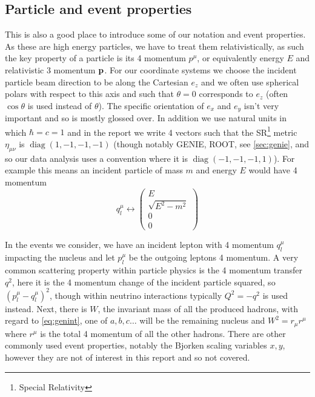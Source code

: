 \documentclass[a4paper,12pt]{article}
\DeclareMathOperator{\diag}{diag}
\begin{document}
\subsection{Particle and event properties}
This is also a good place to introduce some of our notation and event properties.
As these are high energy particles, we have to treat them relativistically, as such the key property of a particle is its 4 momentum $p^\mu$, or equivalently energy $E$ and relativistic 3 momentum $\vb{p}$.
For our coordinate systems we choose the incident particle beam direction to be along the Cartesian $e_z$ and we often use spherical polars with respect to this axis and such that $\theta = 0$ corresponds to $e_z$ (often $\cos{\theta}$ is used instead of $\theta$).
The specific orientation of $e_x$ and $e_y$ isn't very important and so is mostly glossed over.
In addition we use natural units in which $\hbar = c = 1$ and in the report we write 4 vectors such that the SR\footnote{Special Relativity} metric $\eta_{\mu \nu}$ is $\diag(1, -1, -1, -1)$ (though notably GENIE, ROOT, see \cref{sec:genie}, and so our data analysis uses a convention where it is $\diag(-1, -1, -1, 1)$).
For example this means an incident particle of mass $m$ and energy $E$ would have 4 momentum
\begin{equation}
    q_l^\mu \leftrightarrow \begin{pmatrix} E \\ \sqrt{E^2 - m^2} \\ 0 \\ 0 \end{pmatrix}
\end{equation}

In the events we consider, we have an incident lepton with 4 momentum $q_{l}^\mu$ impacting the nucleus and let $p_l^\mu$ be the outgoing leptons 4 momentum.
A very common scattering property within particle physics is the 4 momentum transfer $q^2$, here it is the 4 momentum change of the incident particle squared, so $(p_l^\mu - q_l^\mu)^2$, though within neutrino interactions typically $Q^2 = -q^2$ is used instead.
Next, there is $W$, the invariant mass of all the produced hadrons, with regard to \cref{eq:genint}, one of $a, b, c \ldots$ will be the remaining nucleus and $W^2 = r_\mu r^\mu$ where $r^\mu$ is the total 4 momentum of all the other hadrons.
There are other commonly used event properties, notably the Bjorken scaling variables $x, y$, however they are not of interest in this report and so not covered.
\end{document}
